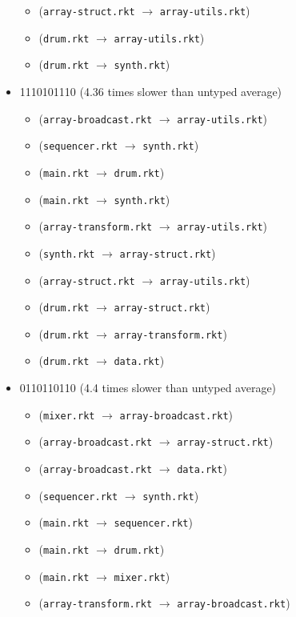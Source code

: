 \documentclass{article}
\newcommand{\mono}[1]{\texttt{#1}}
\begin{document}
\begin{itemize}
\begin{itemize}
  \item (\mono{array-struct.rkt} $\rightarrow$ \mono{array-utils.rkt})
  \item (\mono{drum.rkt} $\rightarrow$ \mono{array-utils.rkt})
  \item (\mono{drum.rkt} $\rightarrow$ \mono{synth.rkt})
  \end{itemize}
\item 1110101110 (4.36 times slower than untyped average)
  \begin{itemize}
  \item (\mono{array-broadcast.rkt} $\rightarrow$ \mono{array-utils.rkt})
  \item (\mono{sequencer.rkt} $\rightarrow$ \mono{synth.rkt})
  \item (\mono{main.rkt} $\rightarrow$ \mono{drum.rkt})
  \item (\mono{main.rkt} $\rightarrow$ \mono{synth.rkt})
  \item (\mono{array-transform.rkt} $\rightarrow$ \mono{array-utils.rkt})
  \item (\mono{synth.rkt} $\rightarrow$ \mono{array-struct.rkt})
  \item (\mono{array-struct.rkt} $\rightarrow$ \mono{array-utils.rkt})
  \item (\mono{drum.rkt} $\rightarrow$ \mono{array-struct.rkt})
  \item (\mono{drum.rkt} $\rightarrow$ \mono{array-transform.rkt})
  \item (\mono{drum.rkt} $\rightarrow$ \mono{data.rkt})
  \end{itemize}
\item 0110110110 (4.4 times slower than untyped average)
  \begin{itemize}
  \item (\mono{mixer.rkt} $\rightarrow$ \mono{array-broadcast.rkt})
  \item (\mono{array-broadcast.rkt} $\rightarrow$ \mono{array-struct.rkt})
  \item (\mono{array-broadcast.rkt} $\rightarrow$ \mono{data.rkt})
  \item (\mono{sequencer.rkt} $\rightarrow$ \mono{synth.rkt})
  \item (\mono{main.rkt} $\rightarrow$ \mono{sequencer.rkt})
  \item (\mono{main.rkt} $\rightarrow$ \mono{drum.rkt})
  \item (\mono{main.rkt} $\rightarrow$ \mono{mixer.rkt})
  \item (\mono{array-transform.rkt} $\rightarrow$ \mono{array-broadcast.rkt})

\end{itemize}
\end{itemize}
\end{document}
